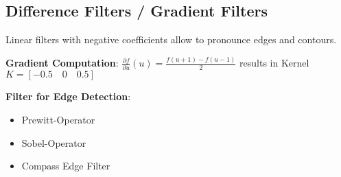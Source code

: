 \subsection{Difference Filters / Gradient Filters}
Linear filters with negative coefficients allow to pronounce edges and contours.

\textbf{Gradient Computation}: \(\frac{\partial f}{\partial u}(u) = \frac{f(u+1) - f(u-1)}{2}\)
 results in Kernel \(K = \left[-0.5\quad 0\quad 0.5\right]\)

\textbf{Filter for Edge Detection}:
\begin{itemize}
    \item Prewitt-Operator
    \item Sobel-Operator
    \item Compass Edge Filter
\end{itemize}
